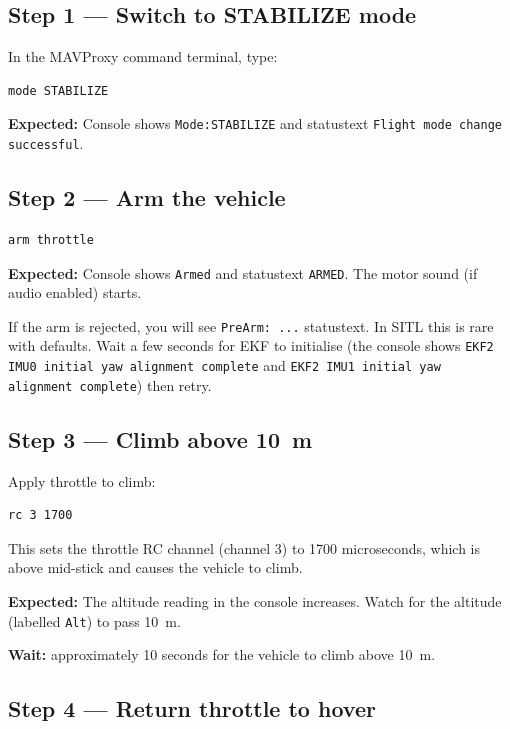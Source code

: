 \documentclass[a4paper,11pt,twoside]{article}
\begin{document}
\subsection*{Step 1 --- Switch to STABILIZE mode}

In the MAVProxy command terminal, type:

\begin{Verbatim}[frame=single,fontsize=\small]
mode STABILIZE
\end{Verbatim}

\textbf{Expected:} Console shows \texttt{Mode:STABILIZE} and statustext \texttt{Flight mode change successful}.

\subsection*{Step 2 --- Arm the vehicle}

\begin{Verbatim}[frame=single,fontsize=\small]
arm throttle
\end{Verbatim}

\textbf{Expected:} Console shows \texttt{Armed} and statustext \texttt{ARMED}. The motor sound (if audio enabled) starts.

If the arm is rejected, you will see \texttt{PreArm: ...} statustext. In SITL this is rare with defaults. Wait a few seconds for EKF to initialise (the console shows \texttt{EKF2 IMU0 initial yaw alignment complete} and \texttt{EKF2 IMU1 initial yaw alignment complete}) then retry.

\subsection*{Step 3 --- Climb above 10~m}

Apply throttle to climb:

\begin{Verbatim}[frame=single,fontsize=\small]
rc 3 1700
\end{Verbatim}

This sets the throttle RC channel (channel 3) to 1700 microseconds, which is above mid-stick and causes the vehicle to climb.

\textbf{Expected:} The altitude reading in the console increases. Watch for the altitude (labelled \texttt{Alt}) to pass 10~m.

\textbf{Wait:} approximately 10 seconds for the vehicle to climb above 10~m.

\subsection*{Step 4 --- Return throttle to hover}
\end{document}
